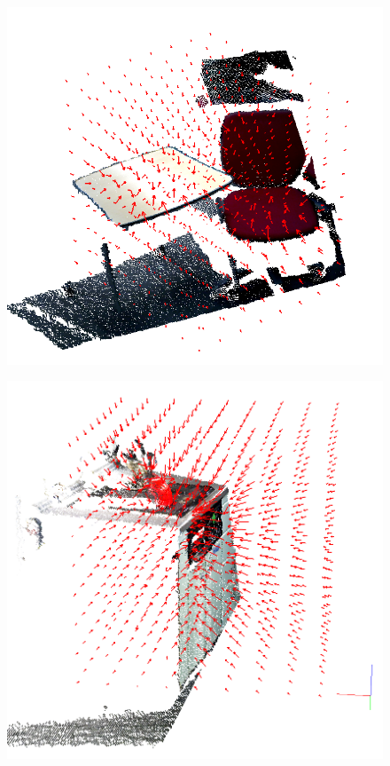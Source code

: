 \vspace{-3mm}
\begin{figure}[htbp]
  \begin{center}
    \begin{minipage}{0.45\hsize}
      \begin{center}
        \includegraphics[clip, width=1.0\columnwidth]{figs/table-chair-potential.png}
        \label{figure:table_potential}
      \end{center}
    \end{minipage}
    \begin{minipage}{0.45\hsize}
      \begin{center}
        \includegraphics[clip, width=0.9\columnwidth]{figs/kitchen_potential_side_3.png}

\end{center}
\end{minipage}
\end{center}
\end{figure}
